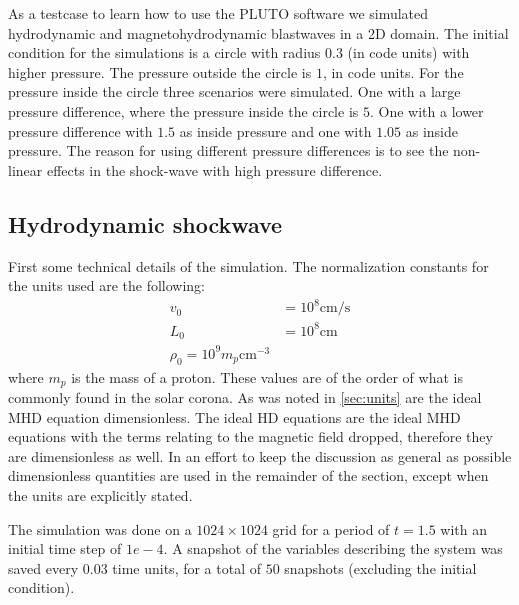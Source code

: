 As a testcase to learn how to use the PLUTO software we simulated hydrodynamic and magnetohydrodynamic blastwaves in a 2D domain. The initial condition for the simulations is a circle with radius $0.3$ (in code units) with higher pressure.
The pressure outside the circle is $1$, in code units. For the pressure inside the circle three scenarios were simulated.
One with a large pressure difference, where the pressure inside the circle is $5$. One with a lower pressure difference with $1.5$ as inside pressure and one with $1.05$ as inside pressure.
The reason for using different pressure differences is to see the non-linear effects in the shock-wave with high pressure difference.

\subsection{Hydrodynamic shockwave}
First some technical details of the simulation.
The normalization constants for the units used are the following:
\begin{align*}
	v_0 &= 10^8 \text{cm/s}\\
	L_0 &= 10^8 \text{cm}\\
	\rho_0 = 10^9 m_p \text{cm}^{-3}
\end{align*}
where $m_p$ is the mass of a proton. These values are of the order of what is commonly found in the solar corona. 
As was noted in \cref{sec:units} are the ideal MHD equation dimensionless.
The ideal HD equations are the ideal MHD equations with the terms relating to the magnetic field dropped, therefore they are dimensionless as well.
In an effort to keep the discussion as general as possible dimensionless quantities are used in the remainder of the section, except when the units are explicitly stated.

The simulation was done on a $1024 \times 1024$ grid for a period of $t=1.5$ with an initial time step of $1e-4$.
A snapshot of the variables describing the system was saved every $0.03$ time units, for a total of $50$ snapshots (excluding the initial condition).

